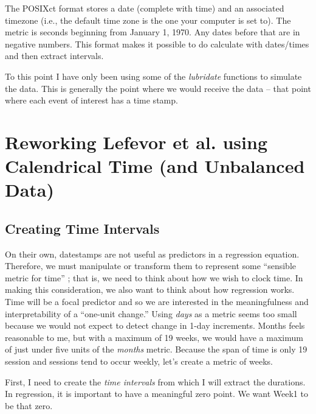 \documentclass[
  11pt,
]{book}
\begin{document}
The POSIXct format stores a date (complete with time) and an associated timezone (i.e., the default time zone is the one your computer is set to). The metric is seconds beginning from January 1, 1970. Any dates before that are in negative numbers. This format makes it possible to do calculate with dates/times and then extract intervals.

To this point I have only been using some of the \emph{lubridate} functions to simulate the data. This is generally the point where we would receive the data -- that point where each event of interest has a time stamp.

\hypertarget{reworking-lefevor-et-al.--lefevor_religious_2017-using-calendrical-time-and-unbalanced-data}{%
\section{\texorpdfstring{Reworking Lefevor et al. \citeyearpar{lefevor_religious_2017} using Calendrical Time (and Unbalanced Data)}{Reworking Lefevor et al. {[}-@lefevor\_religious\_2017{]} using Calendrical Time (and Unbalanced Data)}}\label{reworking-lefevor-et-al.--lefevor_religious_2017-using-calendrical-time-and-unbalanced-data}}

\hypertarget{creating-time-intervals}{%
\subsection{Creating Time Intervals}\label{creating-time-intervals}}

On their own, datestamps are not useful as predictors in a regression equation. Therefore, we must manipulate or transform them to represent some ``sensible metric for time'' \citep{singer_applied_2003}; that is, we need to think about how we wish to clock time. In making this consideration, we also want to think about how regression works. Time will be a focal predictor and so we are interested in the meaningfulness and interpretability of a ``one-unit change.'' Using \emph{days} as a metric seems too small because we would not expect to detect change in 1-day increments. Months feels reasonable to me, but with a maximum of 19 weeks, we would have a maximum of just under five units of the \emph{months} metric. Because the span of time is only 19 session and sessions tend to occur weekly, let's create a metric of weeks.

First, I need to create the \emph{time intervals} from which I will extract the durations. In regression, it is important to have a meaningful zero point. We want Week1 to be that zero.
\end{document}
